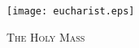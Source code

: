   \begin{center}
   \texttt{[image: eucharist.eps]}
   \par
   \vspace{5ex}
   	\textsc{\Huge{The Holy Mass}}
   \end{center}